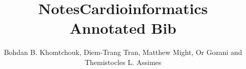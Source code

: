 \documentclass[11pt,legalpaper]{article}
\title{Notes}
\begin{document}
\setcounter{secnumdepth}{0}
\title{Cardioinformatics\\
Annotated Bib}
\author{Bohdan B. Khomtchouk, Diem-Trang Tran, Matthew Might, Or Gozani and Themistocles L. Assimes}

\maketitle
\nocite{*}


\end{document}
